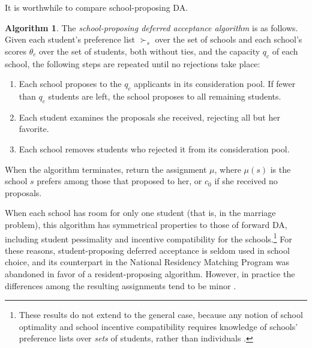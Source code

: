 \documentclass[12pt]{article}
\numberwithin{equation}{subsection}
\theoremstyle{definition}
\newtheorem{algorithm}{Algorithm}
\begin{document}
It is worthwhile to compare school-proposing DA. 
\begin{algorithm}
The \emph{school-proposing deferred acceptance algorithm} is as follows. Given each student's preference list $\succ_s$ over the set of schools and each school's scores $\theta_c$ over the set of students, both without ties, and the capacity $q_c$ of each school, the following steps are repeated until no rejections take place:
\begin{enumerate}
\item Each school proposes to the $q_c$ applicants in its consideration pool. If fewer than $q_c$ students are left, the school proposes to all remaining students.
\item Each student examines the proposals she received, rejecting all but her favorite.
\item Each school removes students who rejected it from its consideration pool.
\end{enumerate}
When the algorithm terminates, return the assignment $\mu$, where $\mu(s)$ is the school $s$ prefers among those that proposed to her, or $c_0$ if she received no proposals.
\end{algorithm}
When each school has room for only one student (that is, in the marriage problem), this algorithm has symmetrical properties to those of forward DA, including student pessimality and incentive compatibility for the schools.\footnote{These results do not extend to the general case, because any notion of school optimality and school incentive compatibility requires knowledge of schools' preference lists over \emph{sets} of students, rather than individuals \parencite[][]{collegeadmissionsisnotmarriage}.} For these reasons, student-proposing deferred acceptance is seldom used in school choice, and its counterpart in the National Residency Matching Program was abandoned in favor of a resident-proposing algorithm. However, in practice the differences among the resulting assignments tend to be minor \parencite[][]{unbalancedrandommatchingmarkets}. 
\end{document}
